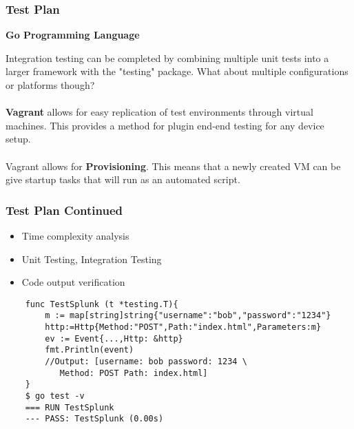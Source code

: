 \begin{frame}

\frametitle{Test Plan}
\textbf{Go Programming Language}

Integration testing can be completed by combining multiple unit tests into a larger framework with the "testing" package. 
What about multiple configurations or platforms though?\\~\\

\textbf {Vagrant} allows for easy replication of test environments through virtual machines. This provides a method for plugin end-end testing for any device setup. \\~\\

Vagrant allows for \textbf{Provisioning}. This means that a newly created VM can be give startup tasks that will run as an automated script.

\end{frame}

\begin{frame}[fragile]
\frametitle{Test Plan Continued}
\begin{itemize} %
	\item Time complexity analysis
    \item Unit Testing, Integration Testing
	\item Code output verification
	\end{itemize}

\begin{example} %
\begin{verbatim}
	func TestSplunk (t *testing.T){
		m := map[string]string{"username":"bob","password":"1234"}
		http:=Http{Method:"POST",Path:"index.html",Parameters:m}
		ev := Event{...,Http: &http}
		fmt.Println(event)
		//Output: [username: bob password: 1234 \
           Method: POST Path: index.html]	
	}
	$ go test -v
	=== RUN TestSplunk
	--- PASS: TestSplunk (0.00s)
\end{verbatim}
\end{example}
\end{frame}

